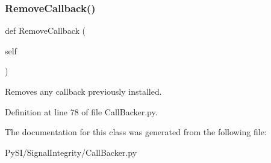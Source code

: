 \subsubsection{\texorpdfstring{Remove\+Callback()}{RemoveCallback()}}
{\footnotesize\ttfamily def Remove\+Callback (\begin{DoxyParamCaption}\item[{}]{self }\end{DoxyParamCaption})}



Removes any callback previously installed. 



Definition at line 78 of file Call\+Backer.\+py.



The documentation for this class was generated from the following file\+:\begin{DoxyCompactItemize}
\item 
Py\+S\+I/\+Signal\+Integrity/Call\+Backer.\+py\end{DoxyCompactItemize}
